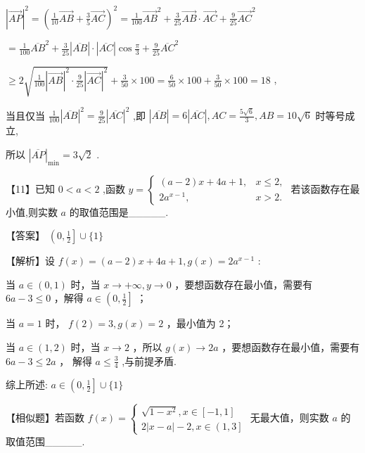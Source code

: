 \documentclass[10pt]{article}
\newcommand*\circled[1]{\tikz[baseline=(char.base)]{\node[shape=circle,draw,inner sep=1.5pt] (char) {\small #1};}}
\begin{document}
\({\left| \overrightarrow{AP}\right| }^{2} = {\left( \frac{1}{10}\overrightarrow{AB} + \frac{3}{5}\overrightarrow{AC}\right) }^{2} = \frac{1}{100}{\overrightarrow{AB}}^{2} + \frac{3}{25}\overrightarrow{AB} \cdot  \overrightarrow{AC} + \frac{9}{25}{\overrightarrow{AC}}^{2}\)

\(= \frac{1}{100}{\overline{AB}}^{2} + \frac{3}{25}\left| \overline{AB}\right|  \cdot  \left| \overline{AC}\right| \cos \frac{\pi }{3} + \frac{9}{25}{\overline{AC}}^{2}\)

\(\geq  2\sqrt{\frac{1}{100}{\left| \overrightarrow{AB}\right| }^{2} \cdot  \frac{9}{25}{\left| \overrightarrow{AC}\right| }^{2}} + \frac{3}{50} \times  {100} = \frac{6}{50} \times  {100} + \frac{3}{50} \times  {100} = {18}\) ,

当且仅当 \(\frac{1}{100}{\left| \overline{AB}\right| }^{2} = \frac{9}{25}{\left| \overline{AC}\right| }^{2}\) ,即 \(\left| \overline{AB}\right|  = 6\left| \overline{AC}\right| ,{AC} = \frac{5\sqrt{6}}{3},{AB} = {10}\sqrt{6}\) 时等号成立,

所以 \({\left| \overline{AP}\right| }_{\min } = 3\sqrt{2}\) .

【11】已知 \(0 < a < 2\) ,函数 \(y = \left\{  \begin{array}{ll} \left( {a - 2}\right) x + {4a} + 1, & x \leq  2, \\  2{a}^{x - 1}, & x > 2. \end{array}\right.\) 若该函数存在最小值,则实数 \(a\) 的取值范围是\_\_\_\_\_.

【答案】 \(\left( {0,\frac{1}{2}}\right\rbrack   \cup  \{ 1\}\)

【解析】设 \(f\left( x\right)  = \left( {a - 2}\right) x + {4a} + 1,g\left( x\right)  = 2{a}^{x - 1}\) :

 \circled{1}  当 \(a \in  \left( {0,1}\right)\) 时，当 \(x \rightarrow   + \infty ,y \rightarrow  0\) ，要想函数存在最小值，需要有 \({6a} - 3 \leq  0\) ，解得 \(a \in  \left( {0,\frac{1}{2}}\right\rbrack\) ；

 \circled{2}  当 \(a = 1\) 时， \(f\left( 2\right)  = 3,g\left( x\right)  = 2\) ，最小值为 2；

 \circled{3}  当 \(a \in  \left( {1,2}\right)\) 时，当 \(x \rightarrow  2\) ，所以 \(g\left( x\right)  \rightarrow  {2a}\) ，要想函数存在最小值，需要有 \({6a} - 3 \leq  {2a}\) ， 解得 \(a \leq  \frac{3}{4}\) ,与前提矛盾.

综上所述: \(a \in  \left( {0,\frac{1}{2}}\right\rbrack   \cup  \{ 1\}\)

【相似题】若函数 \(f\left( x\right)  = \left\{  \begin{array}{l} \sqrt{1 - {x}^{2}},x \in  \left\lbrack  {-1,1}\right\rbrack  \\  2\left| {x - a}\right|  - 2,x \in  \left( {1,3}\right\rbrack   \end{array}\right.\) 无最大值，则实数 \(a\) 的取值范围\_\_\_\_\_.
\end{document}
